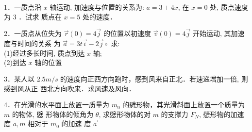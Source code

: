 
1．一质点沿 $x$ 轴运动, 加速度与位置的关系为: $a=3+4 x$, 在 $x=0$ 处, 质点速度为 3 ．试求 质点在 $x=5$ 处的速度．

2．一质点从位失为 $\vec{r}(0)=4 \vec{j}$ 的位置以初速度 $\vec{v}(0)=4 \vec{j}$ 开始运动, 其加速度与时间的关系 为 $\vec{a}=3 t \vec{i}-2 \vec{j} \circ$ 求:\\
(1)经过多长时间, 质点到达 $x$ 轴;\\
(2)到达 $x$ 轴的位置

3．某人以 $2.5 m / s$ 的速度向正西方向跑时，感到风来自正北．若速递增加一倍, 则感到风从正 西北方向吹来．求风速及风向．

4．在光滑的水平面上放置一质量为 $m_{0}$ 的憵形物，其光滑斜面上放置一个质量为 $m$ 的物体, 憵 形物体的倾角为 $\theta$, 求憵形物体的对 $m$ 的支撑力 $F_{N}$, 憵形物的加速度 $a, m$ 相对于 $m_{0}$ 的加速 度 $a^{\prime}$